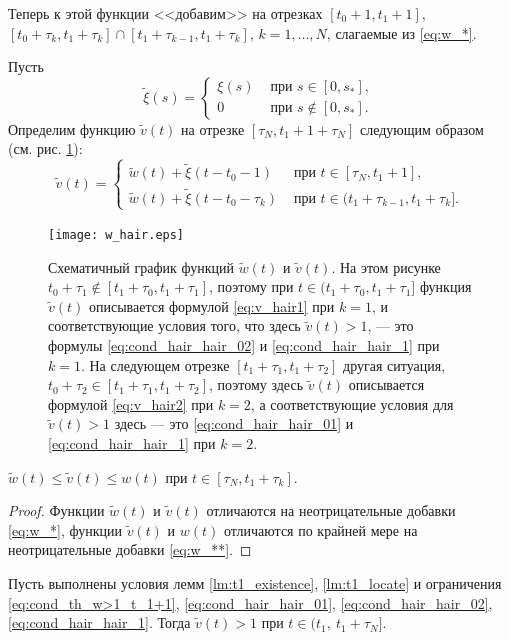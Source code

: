 Теперь к этой функции <<добавим>> на отрезках $[t_0+1,t_1+1]$, $[t_0+\tau_k, t_1+\tau_k]\cap[t_1+\tau_{k-1},t_1+\tau_k]$, $k=1,\ldots,N$, слагаемые из \eqref{eq:w_*}.

Пусть
%
\[
\tilde{\xi}(s) = 
\begin{cases}
	\xi(s) & \text{ при } s\in[0,s_*],\\
	0 & \text{ при } s\notin[0,s_*].
\end{cases}
\]
%
Определим функцию $\tilde{v}(t)$ на отрезке $[\tau_N,t_1+1+\tau_N]$ следующим образом (см. рис. \ref{fig:w_hair}):
%
\[
\tilde{v}(t) =
\begin{cases}
	\tilde{w}(t)+\tilde{\xi}(t-t_0-1)& \text{ при } t\in[\tau_{N}, t_1 + 1],\\
	\tilde{w}(t)+\tilde{\xi}(t-t_0-\tau_k)& \text{ при } t\in(t_1 + \tau_{k-1}, t_1 + \tau_k].
\end{cases}
\]
%
%
\begin{figure}
	\centering
	\texttt{[image: w\_hair.eps]}
	\caption{Схематичный график функций $\tilde{w}(t)$ и $\tilde{v}(t)$. На этом рисунке $t_0+\tau_1 \notin[t_1+\tau_0,t_1+\tau_1]$, поэтому при $t\in(t_1+\tau_0,t_1+\tau_1]$ функция  $\tilde{v}(t)$ описывается формулой \eqref{eq:v_hair1} при $k=1$, и соответствующие условия того, что здесь $\tilde{v}(t)>1$, --- это формулы \eqref{eq:cond_hair_hair_02} и \eqref{eq:cond_hair_hair_1} при $k=1$. На следующем отрезке $[t_1+\tau_1,t_1+\tau_2]$ другая ситуация,  $t_0+\tau_2\in[t_1+\tau_1,t_1+\tau_2]$, поэтому здесь $\tilde{v}(t)$ описывается формулой \eqref{eq:v_hair2} при $k=2$, а соответствующие условия для $\tilde{v}(t)>1$ здесь --- это \eqref{eq:cond_hair_hair_01} и \eqref{eq:cond_hair_hair_1} при $k=2$. }
	\label{fig:w_hair}
\end{figure}
%

%
\begin{proposition}
	\label{prop:w_w_hair}
	$\tilde{w}(t)\leqslant\tilde{v}(t)\leqslant w(t)$ при $t\in[\tau_N,t_1+\tau_k]$.
\end{proposition}
\begin{proof}
	Функции $\tilde{w}(t)$ и $\tilde{v}(t)$ отличаются на неотрицательные добавки \eqref{eq:w_*}, функции $\tilde{v}(t)$ и $w(t)$ отличаются по крайней мере на неотрицательные добавки \eqref{eq:w_**}.
\end{proof}

\begin{proposition}
	\label{prop:v_hair>1}
	Пусть выполнены условия лемм \ref{lm:t1_existence}, \ref{lm:t1_locate} и ограничения \eqref{eq:cond_th_w>1_t_1+1}, \eqref{eq:cond_hair_hair_01}, \eqref{eq:cond_hair_hair_02}, \eqref{eq:cond_hair_hair_1}. Тогда 
	$\tilde{v}(t)>1$ при $t\in(t_1,\ t_1+\tau_N]$.
\end{proposition}

